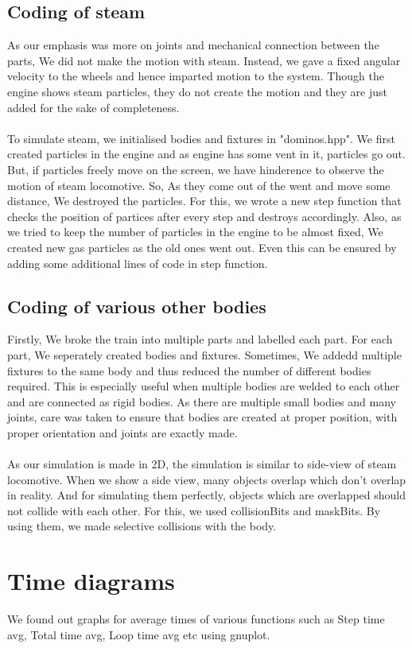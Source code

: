 \documentclass[11pt]{article}
\begin{document}
\subsection{Coding of steam}
As our emphasis was more on joints and mechanical connection between the parts, We did not make the motion with steam. Instead, we gave a fixed angular velocity to the wheels and hence imparted motion to the system. Though the engine shows steam particles, they do not create the motion and they are just added for the sake of completeness. \\ \\
To simulate steam, we initialised bodies and fixtures in "dominos.hpp". We first created particles in the engine and as engine has some vent in it, particles go out. But, if particles freely move on the screen, we have hinderence to observe the motion of steam locomotive. So, As they come out of the went and move some distance,  We destroyed the particles. For this, we wrote a new step function that checks the position of partices after every step and destroys accordingly. Also, as we tried to keep the number of particles in the engine to be almost fixed, We created new gas particles as the old ones went out. Even this can be ensured by adding some additional lines of code in step function.
\subsection{Coding of various other bodies} 
Firstly, We broke the train into multiple parts and labelled each part. For each part, We seperately created bodies and fixtures. Sometimes, We addedd multiple fixtures to the same body and thus reduced the number of different bodies required. This is especially useful when multiple bodies are welded to each other and are connected as rigid bodies. As there are multiple small bodies and many joints, care was taken to ensure that bodies are created at proper position, with proper orientation and joints are exactly made.\\ \\
As our simulation is made in 2D, the simulation is similar to side-view of steam locomotive. When we show a side view, many objects overlap which don't overlap in reality. And for simulating them perfectly, objects which are overlapped should not collide with each other. For this, we used collisionBits and maskBits. By using them, we made selective collisions with the body.   
\section{Time diagrams}
We found out graphs for average times of various functions such as Step time avg, Total time avg, Loop time avg etc using gnuplot. 
\end{document}
